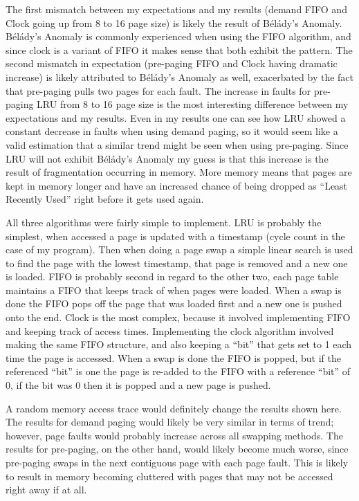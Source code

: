 \documentclass[11pt, letterpaper]{article}
\begin{document}
\smallskip
The first mismatch between my expectations and my results (demand FIFO and Clock going up from 8 to 16 page size) is likely the result of B\'{e}l\'{a}dy's Anomaly.
B\'{e}l\'{a}dy's Anomaly is commonly experienced when using the FIFO algorithm, and since clock is a variant of FIFO it makes sense that both exhibit the pattern.
The second mismatch in expectation (pre-paging FIFO and Clock having dramatic increase) is likely attributed to B\'{e}l\'{a}dy's Anomaly as well, exacerbated by the fact that pre-paging pulls two pages for each fault.
The increase in faults for pre-paging LRU from 8 to 16 page size is the most interesting difference between my expectations and my results.
Even in my results one can see how LRU showed a constant decrease in faults when using demand paging, so it would seem like a valid estimation that a similar trend might be seen when using pre-paging.
Since LRU will not exhibit B\'{e}l\'{a}dy's Anomaly my guess is that this increase is the result of fragmentation occurring in memory.
More memory means that pages are kept in memory longer and have an increased chance of being dropped as ``Least Recently Used'' right before it gets used again.

\smallskip
All three algorithms were fairly simple to implement.
LRU is probably the simplest, when accessed a page is updated with a timestamp (cycle count in the case of my program).
Then when doing a page swap a simple linear search is used to find the page with the lowest timestamp, that page is removed and a new one is loaded.
FIFO is probably second in regard to the other two, each page table maintains a FIFO that keeps track of when pages were loaded.
When a swap is done the FIFO pops off the page that was loaded first and a new one is pushed onto the end.
Clock is the most complex, because it involved implementing FIFO and keeping track of access times.
Implementing the clock algorithm involved making the same FIFO structure, and also keeping a ``bit'' that gets set to 1 each time the page is accessed.
When a swap is done the FIFO is popped, but if the referenced ``bit'' is one the page is re-added to the FIFO with a reference ``bit'' of 0, if the bit was 0 then it is popped and a new page is pushed.

\smallskip
A random memory access trace would definitely change the results shown here.
The results for demand paging would likely be very similar in terms of trend; however, page faults would probably increase across all swapping methods.
The results for pre-paging, on the other hand, would likely become much worse, since pre-paging swaps in the next contiguous page with each page fault.
This is likely to result in memory becoming cluttered with pages that may not be accessed right away if at all.
\end{document}
